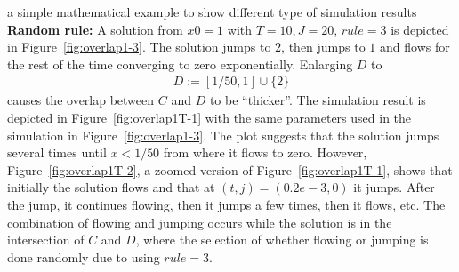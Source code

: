 \begin{example}{a simple mathematical example to show different type of simulation results}
{\bf Random rule:}
A solution from $x0=1$ with $T=10,J=20$, $rule = 3$ is depicted in
Figure~\ref{fig:overlap1-3}. The solution jumps to $2$, then jumps to
$1$ and flows for the rest of the time converging to zero
exponentially.
Enlarging $D$ to
\begin{eqnarray*}
D:=  [1/50,1]\cup\{2\}
\end{eqnarray*}
causes the overlap between $C$ and $D$ to be ``thicker''.
The simulation result is
depicted in Figure~\ref{fig:overlap1T-1}
with the same parameters used in the simulation in
Figure~\ref{fig:overlap1-3}.
The plot suggests that the solution jumps several times until
$x<1/50$ from where it flows to zero.  However,
Figure~\ref{fig:overlap1T-2},
a zoomed version of Figure~\ref{fig:overlap1T-1},
shows that initially the
solution flows and that at $(t,j)=(0.2 e-3,0)$ it jumps. After the jump,
it continues flowing, then it jumps a few times, then it flows, etc.
The combination of flowing and jumping occurs while the solution
is in the intersection of $C$ and $D$, where the selection
of whether flowing or jumping is done randomly due to using $rule=3$.


\end{example}
